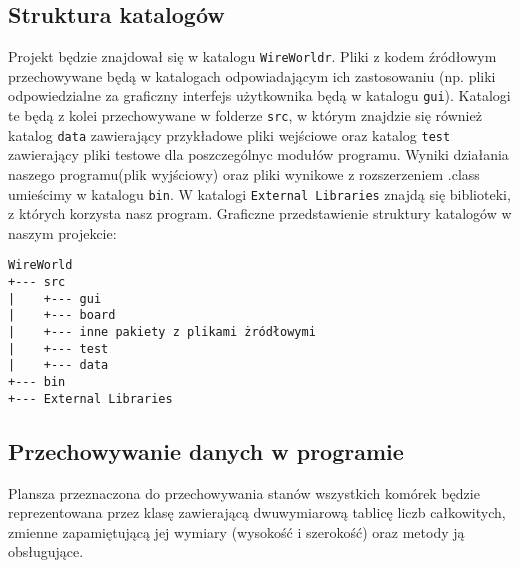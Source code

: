 \documentclass[a4paper,11pt, notitlepage ]{article}
\begin{document}
\subsection{Struktura katalogów}
Projekt będzie znajdował się w katalogu \verb+WireWorldr+.  Pliki z kodem źródłowym przechowywane będą w katalogach odpowiadającym ich zastosowaniu (np. pliki odpowiedzialne za graficzny interfejs użytkownika będą w katalogu \verb+gui+). Katalogi te będą z kolei przechowywane w folderze \verb+src+, w którym znajdzie się również katalog \verb+data+ zawierający przykładowe pliki wejściowe oraz katalog \verb+test+ zawierający pliki testowe dla poszczególnyc modułów programu. Wyniki działania naszego programu(plik wyjściowy) oraz pliki wynikowe z rozszerzeniem .class umieścimy w katalogu \verb+bin+. W katalogi \verb+External Libraries+ znajdą się biblioteki, z których korzysta nasz program.
Graficzne przedstawienie struktury katalogów w naszym projekcie:
\begin{verbatim}
WireWorld
+--- src
|    +--- gui 
|    +--- board
|    +--- inne pakiety z plikami żródłowymi
|    +--- test
|    +--- data
+--- bin
+--- External Libraries
\end{verbatim}
\subsection{Przechowywanie danych w programie}
 Plansza przeznaczona do przechowywania stanów wszystkich komórek będzie reprezentowana przez klasę zawierającą dwuwymiarową tablicę liczb całkowitych, zmienne zapamiętującą jej wymiary (wysokość i szerokość) oraz metody ją obsługujące.
\end{document}
